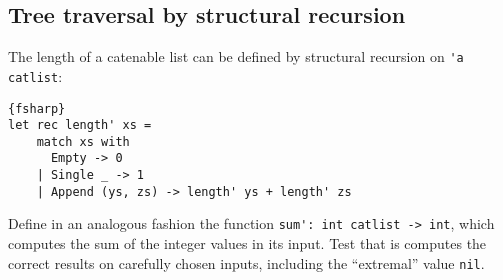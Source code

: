 \subsection*{Tree traversal by structural recursion}

The length of a catenable list can be defined by structural recursion on \verb|'a catlist|:
\begin{lstlisting}{fsharp}
let rec length' xs =
    match xs with
      Empty -> 0
    | Single _ -> 1
    | Append (ys, zs) -> length' ys + length' zs
\end{lstlisting}

Define in an analogous fashion the function \verb|sum': int catlist -> int|, which computes the sum of the integer values in its
input. Test that is computes the correct results on carefully chosen inputs, including the ``extremal'' value \verb|nil|.
